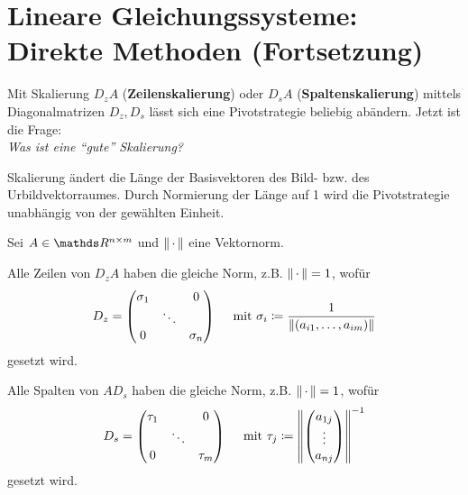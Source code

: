 % 
% 
% 
% 



\chapter{Lineare Gleichungssysteme: Direkte Methoden (Fortsetzung)}


Mit Skalierung $D_zA$ (\textbf{Zeilenskalierung}) oder
$D_sA$ (\textbf{Spaltenskalierung})
mittels Diagonalmatrizen $D_z, D_s$ lässt sich eine Pivotstrategie beliebig abändern.
Jetzt ist die Frage: \\
\textit{Was ist eine \enquote{gute} Skalierung?}

Skalierung ändert die Länge der Basisvektoren des Bild- bzw. des Urbildvektorraumes.
Durch Normierung der Länge auf 1 wird die Pivotstrategie unabhängig von der 
gewählten Einheit.

Sei $A\in\Renm $ und $\left\| \,\cdot\, \right\| $ eine Vektornorm.


 
Alle Zeilen von $D_zA$ haben die gleiche Norm, z.B. $\left\| \,\cdot\, \right\| =1$, wofür 
\begin{gather}
  D_z = \begin{pmatrix}
    \sigma_1 & & 0 \\
    &\ddots & \\ 
    0 && \sigma_n
  \end{pmatrix}
  \quad \text{ mit }\sigma_i\coloneqq \frac{1}{\left\| (a_{i1}, \dots , a_{im}) \right\|}
  \label{IV.1.1}
\end{gather}
gesetzt wird.


 
Alle Spalten von $AD_s$ haben die gleiche Norm, z.B. $\left\| \,\cdot\, \right\| =1$, wofür 
\begin{gather}
  D_s = \begin{pmatrix}
    \tau_1 & & 0 \\
    &\ddots & \\ 
    0 && \tau_m
  \end{pmatrix}
  \quad \text{ mit }\tau_j\coloneqq \left\| \begin{pmatrix}
      a_{1j} \\ \vdots \\ a_{nj}
    \end{pmatrix} \right\|^{-1}
  \label{IV.1.2}
\end{gather}
gesetzt wird.

